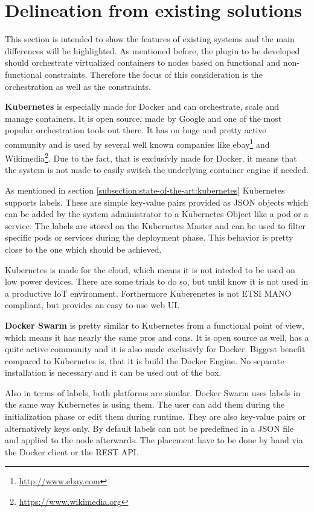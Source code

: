 \section{Delineation from existing solutions}
This section is intended to show the features of existing systems and the main differences will be highlighted.
As mentioned before, the plugin to be developed should orchestrate virtualized containers to nodes based on functional and non-functional constraints.
Therefore the focus of this consideration is the orchestration as well as the constraints.

\textbf{Kubernetes} is especially made for Docker and can orchestrate, scale and manage containers.
It is open source, made by Google and one of the most popular orchestration tools out there.
It has on huge and pretty active community and is used by several well known companies\cite{Kubernetes:Case-Studies} like ebay\footnote{\url{http://www.ebay.com}} and Wikimedia\footnote{\url{https://www.wikimedia.org}}.
Due to the fact, that is exclusivly made for Docker, it means that the system is not made to easily switch the underlying container engine if needed.

As mentioned in section \ref{subsection:state-of-the-art:kubernetes} Kubernetes supports labels.
These are simple key-value pairs provided as \ac{JSON} objects which can be added by the system administrator to a Kubernetes Object like a pod or a service.
The labels are stored on the Kubernetes Master and can be used to filter specific pods or services during the deployment phase.
This behavior is pretty close to the one which should be achieved.

Kubernetes is made for the cloud, which means it is not inteded to be used on low power devices.
There are some trials to do so, but until know it is not used in a productive \ac{IoT} environment.
Forthermore Kuberenetes is not \ac{ETSI} \ac{MANO} compliant, but provides an easy to use web \ac{UI}.

\textbf{Docker Swarm} is pretty similar to Kubernetes from a functional point of view, which means it has nearly the same pros and cons.
It is open source as well, has a quite active community and it is also made exclusivly for Docker.
Biggest benefit compared to Kubernetes is, that it is build the Docker Engine.
No separate installation is necessary and it can be used out of the box.

Also in terms of labels, both platforms are similar.
Docker Swarm uses labels in the same way Kubernetes is using them.
The user can add them during the initialization phase or edit them during runtime.
They are also key-value pairs or alternatively keys only.
By default labels can not be predefined in a \ac{JSON} file and applied to the node afterwards.
The placement have to be done by hand via the Docker client or the \ac{REST} \ac{API}.

